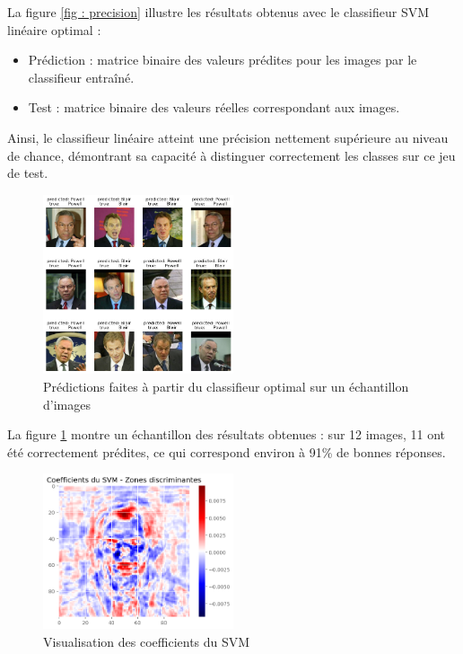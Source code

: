 \documentclass[a4paper,12pt]{article}
\begin{document}
La figure \ref{fig : precision} illustre les résultats obtenus avec le classifieur SVM linéaire optimal : 
\begin{itemize}
    \item Prédiction : matrice binaire des valeurs prédites pour les images par le classifieur entraîné.
    \item Test : matrice binaire des valeurs réelles correspondant aux images.
\end{itemize}

Ainsi, le classifieur linéaire atteint une précision nettement supérieure au niveau de chance, démontrant sa capacité à distinguer correctement les classes sur ce jeu de test.

\begin{figure}[H]
    \centering
    \includegraphics[width=0.5\textwidth]{Images/prediction_visage.png}
    \caption{Prédictions faites à partir du classifieur optimal sur un échantillon d'images}\label{fig:predict}
\end{figure}

La figure \ref{fig:predict} montre un échantillon des résultats obtenues : sur 12 images, 11 ont été correctement prédites, ce qui correspond environ à 91\% de bonnes réponses.

\begin{figure}[H]
    \centering
    \includegraphics[width=0.5\textwidth]{Images/coeff_visage.png}
    \caption{Visualisation des coefficients du SVM}\label{fig : ?}
\end{figure}
\end{document}

